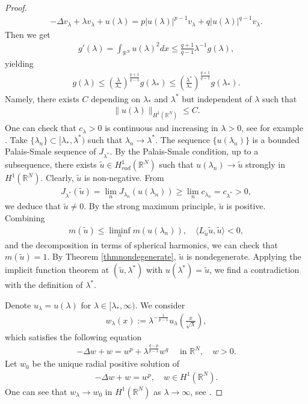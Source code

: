 \documentclass{article}
\theoremstyle{definition} \theoremstyle{remark}
\numberwithin{equation}{section}
\newcommand{\R}{\mathbb{R}}
\newcommand{\la}{\lambda}
\begin{document}
\begin{proof}
		\begin{align*}
			-\Delta v_\la + \la v_\la + u(\la) = p|u(\la)|^{p-1}v_\la + q|u(\la)|^{q-1}v_\la.
		\end{align*}
		Then we get
		\begin{align*}
			g'(\la) = \int_{\R^N}u(\la)^2 dx \le \frac{q+1}{q-1}\la^{-1} g(\la),
		\end{align*}
		yielding
		\begin{align*}
			g(\la) \le \left(\frac{\la}{\la_*}\right)^{\frac{q+1}{q-1}}g(\la_*) \le \left(\frac{\la^*}{\la_*}\right)^{\frac{q+1}{q-1}}g(\la_*).
		\end{align*}
		Namely, there exists $C$ depending on $\la_*$ and $\la^*$ but independent of $\la$ such that
		\begin{align*}
			\|u(\la)\|_{H^1(\R^N)} \le C.
		\end{align*}
		One can check that $c_\la > 0$ is continuous and increasing in $\la > 0$, see for example \cite{Song}. Take $\{\la_n\} \subset [\la_*,\la^*)$ such that $\la_n \to \la^*$. The sequence $\{u(\la_n)\}$ is a bounded Palais-Smale sequence of $J_{\la^*}$. By the Palais-Smale condition, up to a subsequence, there exists $\tilde{u} \in H_{rad}^1(\R^N)$ such that $u(\la_n) \to \tilde{u}$ strongly in $H^1(\R^N)$. Clearly, $\tilde{u}$ is non-negative. From
		\begin{align*}
			J_{\la^*}(\tilde{u}) = \lim_{n}J_{\la_n}(u(\la_n)) \ge \lim_{n}c_{\la_n} = c_{\la^*} > 0,
 		\end{align*}
		we deduce that $\tilde{u} \neq 0$. By the strong maximum principle, $\tilde{u}$ is positive. Combining
		\begin{align*}
			m(\tilde{u}) \le \liminf_{n}m(u(\la_n)), \quad \langle L_{\tilde{u}}\tilde{u},\tilde{u} \rangle < 0,
		\end{align*}
		and the decomposition in terms of spherical harmonics, we can check that $m(\tilde{u}) = 1$. By Theorem \ref{thmnondegenerate}, $\tilde{u}$ is nondegenerate. Applying the implicit function theorem at $(\tilde{u}, \la^*)$ with $u(\la^*) = \tilde{u}$, we find a contradiction with the definition of $\la^*$.

		Denote $u_\la = u(\la)$ for $\la \in [\la_*,\infty)$. We consider
		\begin{align*}
			w_\la(x) := \la^{-\frac{1}{p-1}}u_\la\left(\frac{x}{\sqrt{\la}}\right),
		\end{align*}
		which satisfies the following equation
		\begin{align} \label{scalingequation}
			-\Delta w + w = w^p + \la^{\frac{q-p}{p-1}}w^q \quad \text{ in } \R^N, \quad w > 0.
		\end{align}
		Let $w_0$ be the unique radial positive solution of
		\begin{align*}
			-\Delta w + w = w^p, \quad w \in H^1(\R^N).
		\end{align*}
		One can see that $w_\la \to w_0$ in $H^1(\R^N)$ as $\la \to \infty$, see \cite[Theorem 4.10]{JZZ}.
		

\end{proof}
\end{document}
